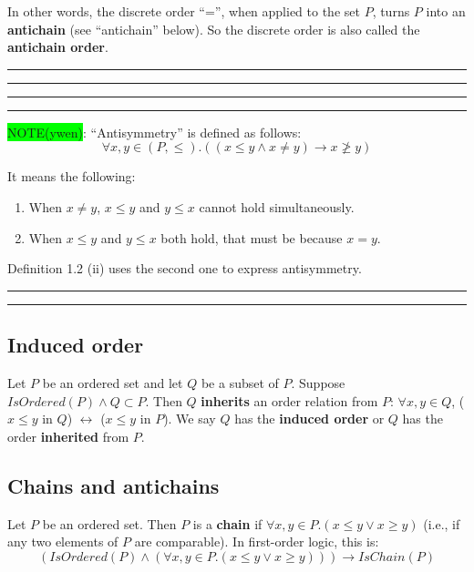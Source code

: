 \documentclass[12pt, letterpaper, oneside]{book}
\begin{document}
In other words, the discrete order ``='', when applied to the set $P$, turns $P$ into an \textbf{antichain} (see
``antichain'' below). So the discrete order is also called the \textbf{antichain order}.

\noindent\rule{10cm}{0.4pt}\rule{1cm}{10pt}

\noindent\rule[-9pt]{1cm}{10pt}\rule{10cm}{0.4pt}

\colorbox{lime}{NOTE(ywen)}: ``Antisymmetry'' is defined as follows:
\[ \forall x, y \in (P, \leqslant). ((x \leqslant y \land x \ne y) \rightarrow x \ngeqslant y) \]

It means the following:
\begin{enumerate}
  \item When $x \ne y$, $x \leqslant y$ and $y \leqslant x$ cannot hold simultaneously.
  \item When $x \leqslant y$ and $y \leqslant x$ both hold, that must be because $x = y$.
\end{enumerate}

Definition 1.2 (ii) uses the second one to express antisymmetry.

\noindent\rule{10cm}{0.4pt}\rule{1cm}{10pt}

\subsection{Induced order}

Let $P$ be an ordered set and let $Q$ be a subset of $P$.
Suppose $IsOrdered(P) \land Q \subset P$. Then $Q$ \textbf{inherits} an order relation from $P$: $\forall x, y \in Q$,
($x \leqslant y$ in $Q$) $\leftrightarrow$ ($x \leqslant y$ in $P$). We say $Q$ has the \textbf{induced order} or $Q$
has the order \textbf{inherited} from $P$.

\subsection{Chains and antichains}

Let $P$ be an ordered set. Then $P$ is a \textbf{chain} if $\forall x, y \in P. (x \leqslant y \lor x \geqslant y)$
(i.e., if any two elements of $P$ are comparable). In first-order logic, this is:
\[ (IsOrdered(P) \land (\forall x, y \in P. (x \leqslant y \lor x \geqslant y))) \rightarrow IsChain(P) \]
\end{document}
